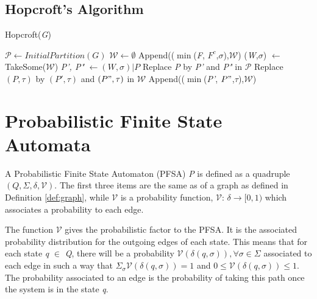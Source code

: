 {\subsection{Hopcroft's Algorithm}

\begin{algorithm} 
  \caption{Hopcroft(\textit{G})\label{alg:hop}}
    \begin{algorithmic}[1]
      \State $\mathcal{P} \leftarrow InitialPartition(G)$
      \State $\mathcal{W} \leftarrow \emptyset$
      \ForAll{$\sigma \in \Sigma$}
      	\State Append(($\min$(\textit{F}, $F^c$,$\sigma$),$\mathcal{W}$)
      		\State (\textit{W},$\sigma$) $\leftarrow$ TakeSome($\mathcal{W}$)
				\State \textit{P', P"} $\leftarrow (W,\sigma)|P$      		
				Replace \textit{P} by \textit{P'} and \textit{P"} in $\mathcal{P}$
				\ForAll{$\tau \in \Sigma$}
						\State Replace $(P,\tau)$ by $(P',\tau)$ and $(P",\tau)$ in $\mathcal{W}$
					\Else
						\State Append(($\min$(\textit{P'}, $P"$,$\tau$),$\mathcal{W}$)				
					\EndIf				
				\EndFor 
      		\EndFor
      	\EndWhile
      \EndFor
    \end{algorithmic}
  \end{algorithm}

\section{Probabilistic Finite State Automata}

\begin{definition}\label{definition:pfsa}
A Probabilistic Finite State Automaton (PFSA) \textit{P} is defined as a quadruple $(Q, \Sigma, \delta, \mathcal{V})$. The first three items are the same as of a graph as defined in Definition \ref{def:graph}, while  $\mathcal{V}$ is a probability function, $\mathcal{V}$: $\delta \rightarrow [0,1)$ which associates a probability to each edge.
\end{definition}

The function $\mathcal{V}$ gives the probabilistic factor to the PFSA. It is the associated probability distribution for the outgoing edges of each state. This means that for each state \textit{q} $\in$ \textit{Q}, there will be a probability $\mathcal{V}(\delta(q, \sigma)), \forall \sigma \in \Sigma$ associated to each edge in such a way that $\Sigma_{\sigma}\mathcal{V}(\delta(q,\sigma)) = 1$ and $0 \leq \mathcal{V}(\delta(q,\sigma)) \leq 1$. The probability associated to an edge is the probability of taking this path once the system is in the state \textit{q}. 

}
